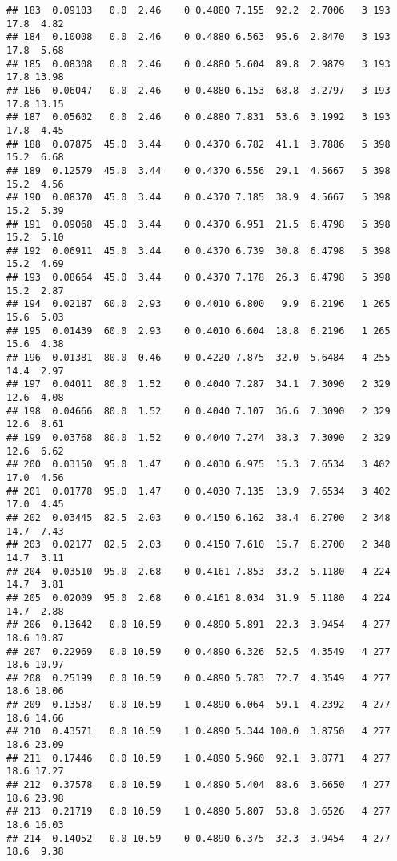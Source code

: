 \documentclass[
]{article}
\begin{document}
\begin{verbatim}
## 183  0.09103   0.0  2.46    0 0.4880 7.155  92.2  2.7006   3 193    17.8  4.82
## 184  0.10008   0.0  2.46    0 0.4880 6.563  95.6  2.8470   3 193    17.8  5.68
## 185  0.08308   0.0  2.46    0 0.4880 5.604  89.8  2.9879   3 193    17.8 13.98
## 186  0.06047   0.0  2.46    0 0.4880 6.153  68.8  3.2797   3 193    17.8 13.15
## 187  0.05602   0.0  2.46    0 0.4880 7.831  53.6  3.1992   3 193    17.8  4.45
## 188  0.07875  45.0  3.44    0 0.4370 6.782  41.1  3.7886   5 398    15.2  6.68
## 189  0.12579  45.0  3.44    0 0.4370 6.556  29.1  4.5667   5 398    15.2  4.56
## 190  0.08370  45.0  3.44    0 0.4370 7.185  38.9  4.5667   5 398    15.2  5.39
## 191  0.09068  45.0  3.44    0 0.4370 6.951  21.5  6.4798   5 398    15.2  5.10
## 192  0.06911  45.0  3.44    0 0.4370 6.739  30.8  6.4798   5 398    15.2  4.69
## 193  0.08664  45.0  3.44    0 0.4370 7.178  26.3  6.4798   5 398    15.2  2.87
## 194  0.02187  60.0  2.93    0 0.4010 6.800   9.9  6.2196   1 265    15.6  5.03
## 195  0.01439  60.0  2.93    0 0.4010 6.604  18.8  6.2196   1 265    15.6  4.38
## 196  0.01381  80.0  0.46    0 0.4220 7.875  32.0  5.6484   4 255    14.4  2.97
## 197  0.04011  80.0  1.52    0 0.4040 7.287  34.1  7.3090   2 329    12.6  4.08
## 198  0.04666  80.0  1.52    0 0.4040 7.107  36.6  7.3090   2 329    12.6  8.61
## 199  0.03768  80.0  1.52    0 0.4040 7.274  38.3  7.3090   2 329    12.6  6.62
## 200  0.03150  95.0  1.47    0 0.4030 6.975  15.3  7.6534   3 402    17.0  4.56
## 201  0.01778  95.0  1.47    0 0.4030 7.135  13.9  7.6534   3 402    17.0  4.45
## 202  0.03445  82.5  2.03    0 0.4150 6.162  38.4  6.2700   2 348    14.7  7.43
## 203  0.02177  82.5  2.03    0 0.4150 7.610  15.7  6.2700   2 348    14.7  3.11
## 204  0.03510  95.0  2.68    0 0.4161 7.853  33.2  5.1180   4 224    14.7  3.81
## 205  0.02009  95.0  2.68    0 0.4161 8.034  31.9  5.1180   4 224    14.7  2.88
## 206  0.13642   0.0 10.59    0 0.4890 5.891  22.3  3.9454   4 277    18.6 10.87
## 207  0.22969   0.0 10.59    0 0.4890 6.326  52.5  4.3549   4 277    18.6 10.97
## 208  0.25199   0.0 10.59    0 0.4890 5.783  72.7  4.3549   4 277    18.6 18.06
## 209  0.13587   0.0 10.59    1 0.4890 6.064  59.1  4.2392   4 277    18.6 14.66
## 210  0.43571   0.0 10.59    1 0.4890 5.344 100.0  3.8750   4 277    18.6 23.09
## 211  0.17446   0.0 10.59    1 0.4890 5.960  92.1  3.8771   4 277    18.6 17.27
## 212  0.37578   0.0 10.59    1 0.4890 5.404  88.6  3.6650   4 277    18.6 23.98
## 213  0.21719   0.0 10.59    1 0.4890 5.807  53.8  3.6526   4 277    18.6 16.03
## 214  0.14052   0.0 10.59    0 0.4890 6.375  32.3  3.9454   4 277    18.6  9.38

\end{verbatim}
\end{document}
